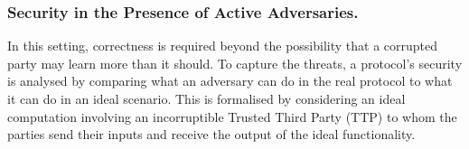  \subsubsection{Security in the Presence of Active Adversaries.}  In this setting, correctness is required beyond the possibility that a corrupted party may learn more than it should. To capture the threats,
a protocol's security is analysed by comparing what an adversary can do in the real protocol to what it can do in an ideal scenario. This is formalised by considering an ideal computation involving an incorruptible Trusted Third Party (TTP) to whom the parties send their inputs and receive the output of the ideal functionality. %

%
%
%
% 
% 
% 
 
